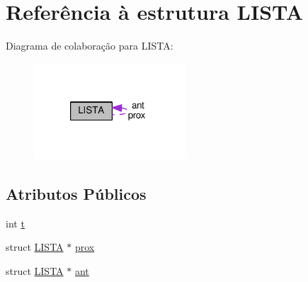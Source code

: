 \hypertarget{structLISTA}{\section{Referência à estrutura L\-I\-S\-T\-A}
\label{structLISTA}
}


Diagrama de colaboração para L\-I\-S\-T\-A\-:\nopagebreak
\begin{figure}[H]
\begin{center}
\leavevmode
\includegraphics[width=160pt]{structLISTA__coll__graph}
\end{center}
\end{figure}
\subsection*{Atributos Públicos}
\begin{DoxyCompactItemize}
\item 
int \hyperlink{structLISTA_a81b29c44560db14d9d5ef75858c91a0b}{t}
\item 
struct \hyperlink{structLISTA}{L\-I\-S\-T\-A} $\ast$ \hyperlink{structLISTA_a818a9fbd5f34b29597c140c052309ea6}{prox}
\item 
struct \hyperlink{structLISTA}{L\-I\-S\-T\-A} $\ast$ \hyperlink{structLISTA_acbab5a56fa16181657e3036ffa9fca11}{ant}
\end{DoxyCompactItemize}



